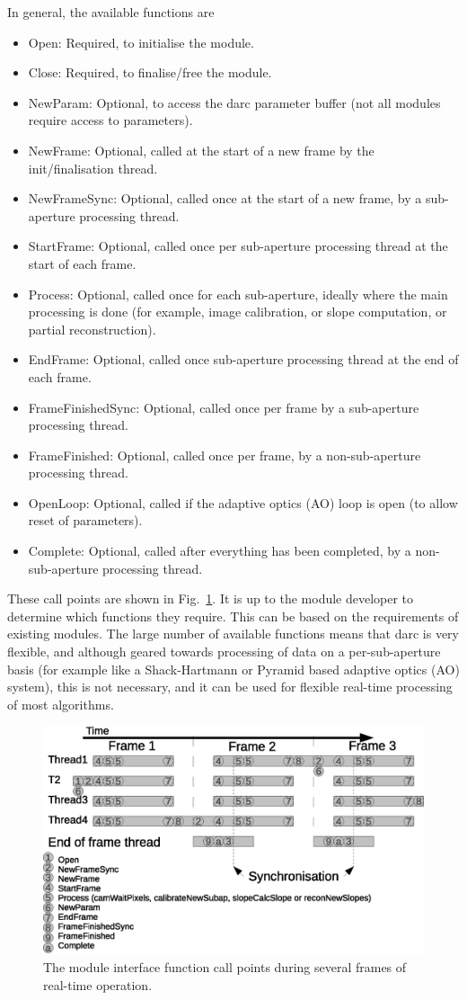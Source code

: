 \documentclass[a4,10pt]{article}
\newcommand{\ao}{adaptive optics (AO)\renewcommand{\ao}{AO\xspace}\xspace}
\begin{document}
In general, the available functions are
\begin{itemize}
\item Open:  Required, to initialise the module.
\item Close: Required, to finalise/free the module.
\item NewParam: Optional, to access the darc parameter buffer (not all
  modules require access to parameters).
\item NewFrame: Optional, called at the start of a new frame by the
  init/finalisation thread.
\item NewFrameSync: Optional, called once at the start of a new frame,
  by a sub-aperture processing thread.
\item StartFrame:  Optional, called once per sub-aperture processing
  thread at the start of each frame.
\item Process: Optional, called once for each sub-aperture,
  ideally where the main processing is done (for example, image
  calibration, or slope computation, or partial reconstruction).
\item EndFrame: Optional, called once sub-aperture processing thread
  at the end of each frame.
\item FrameFinishedSync: Optional, called once per frame by a
  sub-aperture processing thread.
\item FrameFinished: Optional, called once per frame, by a
  non-sub-aperture processing thread.
\item OpenLoop: Optional, called if the \ao loop is open (to allow
  reset of parameters).
\item Complete: Optional, called after everything has been completed,
  by a non-sub-aperture processing thread.
\end{itemize}

These call points are shown in Fig.~\ref{fig:hooks}.  It is up to the
module developer to determine which functions they require.  This can
be based on the requirements of existing modules.  The large number of
available functions means that darc is very flexible, and although
geared towards processing of data on a per-sub-aperture basis (for
example like a Shack-Hartmann or Pyramid based \ao system), this is
not necessary, and it can be used for flexible real-time processing of
most algorithms.

\begin{figure}
\includegraphics[width=0.5\linewidth]{hooks.eps}
\caption{The module interface function call points during several
  frames of real-time operation.}
\label{fig:hooks}
\end{figure}
\end{document}
